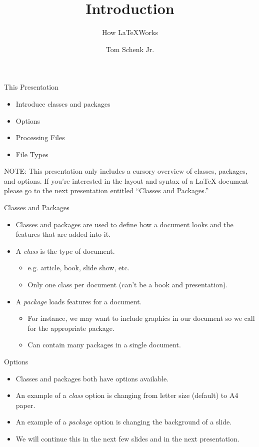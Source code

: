 \documentclass[pdf]{prosper}
\title{Introduction}
\subtitle{How \LaTeX Works}
\author{Tom Schenk Jr.}
\begin{document}
\maketitle
\begin{slide}{This Presentation}
	\begin{itemize}
		\item Introduce classes and packages
		\item Options
		\item Processing Files
		\item File Types
	\end{itemize}
NOTE: This presentation only includes a cursory overview of classes, packages, and options. If you're interested in the layout and syntax of a \LaTeX\mbox{} document please go to the next presentation entitled ``Classes and Packages.''
\end{slide}
\begin{slide}{Classes and Packages}
	\begin{itemize}
		\item Classes and packages are used to define how a document looks and the features that are added into it.
		\item A \textit{class} is the type of document.
			\begin{itemize}
				\item e.g. article, book, slide show, etc.
				\item Only one class per document (can't be a book and presentation).
			\end{itemize}
		\item A \textit{package} loads features for a document.
			\begin{itemize}
				\item For instance, we may want to include graphics in our document so we call for the appropriate package.
				\item Can contain many packages in a single document.
			\end{itemize}
	\end{itemize}
\end{slide}
\begin{slide}{Options}
	\begin{itemize}
		\item Classes and packages both have options available.
		\item An example of a \textit{class} option is changing from letter size (default) to A4 paper.
		\item An example of a \textit{package} option is changing the background of a slide.
		\item We will continue this in the next few slides and in the next presentation.
	\end{itemize}
\end{slide}
\end{document}
